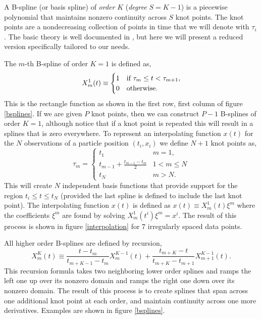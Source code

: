 \documentclass[10pt,journal]{IEEEtran}
\begin{document}
A B-spline (or basis spline) of \emph{order} $K$ (\emph{degree} $S=K-1$) is a piecewise polynomial that maintains nonzero continuity across $S$ knot points. The knot points are a nondecreasing collection of points in time that we will denote with $\tau_i$. The basic theory is well documented in \cite{deboor1978-book}, but here we will present a reduced version specifically tailored to our needs.

The $m$-th B-spline of order $K=1$ is defined as,
\begin{equation}
X^1_m(t) \equiv \begin{cases}
1      & \text{if $ \tau_m \leq t < \tau_{m+1}$}, \\
0     & \text{otherwise}.
\end{cases}
\end{equation}
This is the rectangle function as shown in the first row, first column of figure \ref{bsplines}. If we are given $P$ knot points, then we can construct $P-1$ B-splines of order $K=1$, although notice that if a knot point is repeated this will result in a splines that is zero everywhere. To represent an interpolating function $x(t)$ for the $N$ observations of a particle position $(t_i,x_i)$ we define $N+1$ knot points as,
\begin{equation}
\tau_m = \begin{cases}
t_1      & \text{$m=1$}, \\
t_{m-1} + \frac{t_{m-1}-t_m}{2}	  & \text{$1<m \leq N$}\\
t_N     & \text{$m>N$}.
\end{cases}
\end{equation}
This will create $N$ independent basis functions that provide support for the region $t_i \leq t \leq t_N$ (provided the last spline is defined to include the last knot point). The interpolating function $x(t)$ is defined as $x(t) \equiv  X^1_m(t) \xi^m$ where the coefficients $\xi^m$ are found by solving $X^1_m(t^i) \xi^m = x^i$. The result of this process is shown in figure \ref{interpolation} for 7 irregularly spaced data points.

All higher order B-splines are defined by recursion,
\begin{equation}
X^K_m(t) \equiv \frac{t - t_m}{t_{m+K-1} - t_m} X^{K-1}_m(t) + \frac{t_{m+K}-t}{t_{m+K} - t_{m+1}} X^{K-1}_{m+1}(t).
\end{equation}
This recursion formula takes two neighboring lower order splines and ramps the left one up over its nonzero domain and ramps the right one down over its nonzero domain. The result of this process is to create splines that span across one additional knot point at each order, and maintain continuity across one more derivatives. Examples are shown in figure \ref{bsplines}.
\end{document}

